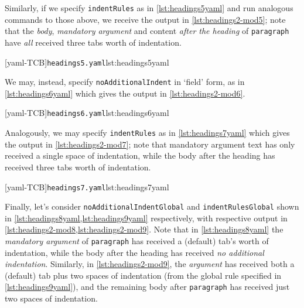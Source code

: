  Similarly, if we specify \texttt{indentRules} as in \cref{lst:headings5yaml} and run
 analogous commands to those above, we receive the output in \cref{lst:headings2-mod5};
 note that the \emph{body}, \emph{mandatory argument} and content \emph{after the heading}
 of \texttt{paragraph} have \emph{all} received three tabs worth of indentation.

 \begin{cmhtcbraster}[raster force size=false,
   raster column 1/.style={add to width=1cm},
   raster column 2/.style={add to width=-1cm},
  ]
  [yaml-TCB]{\texttt{headings5.yaml}}{lst:headings5yaml}
 \end{cmhtcbraster}

 We may, instead, specify \texttt{noAdditionalIndent} in `field' form, as in
 \cref{lst:headings6yaml} which gives the output in \cref{lst:headings2-mod6}.

 \begin{cmhtcbraster}
  [yaml-TCB]{\texttt{headings6.yaml}}{lst:headings6yaml}
 \end{cmhtcbraster}

 Analogously, we may specify \texttt{indentRules} as in \cref{lst:headings7yaml} which
 gives the output in \cref{lst:headings2-mod7}; note that mandatory argument text has only
 received a single space of indentation, while the body after the heading has received
 three tabs worth of indentation.

 \begin{cmhtcbraster}
  [yaml-TCB]{\texttt{headings7.yaml}}{lst:headings7yaml}
 \end{cmhtcbraster}

 Finally, let's consider \texttt{noAdditionalIndentGlobal} and \texttt{indentRulesGlobal}
 shown in \cref{lst:headings8yaml,lst:headings9yaml} respectively, with respective output
 in \cref{lst:headings2-mod8,lst:headings2-mod9}. Note that in \cref{lst:headings8yaml}
 the \emph{mandatory argument} of \texttt{paragraph} has received a (default) tab's worth
 of indentation, while the body after the heading has received \emph{no additional
 indentation}. Similarly, in \cref{lst:headings2-mod9}, the \emph{argument} has received
 both a (default) tab plus two spaces of indentation (from the global rule specified in
 \cref{lst:headings9yaml}), and the remaining body after \texttt{paragraph} has received
 just two spaces of indentation.

